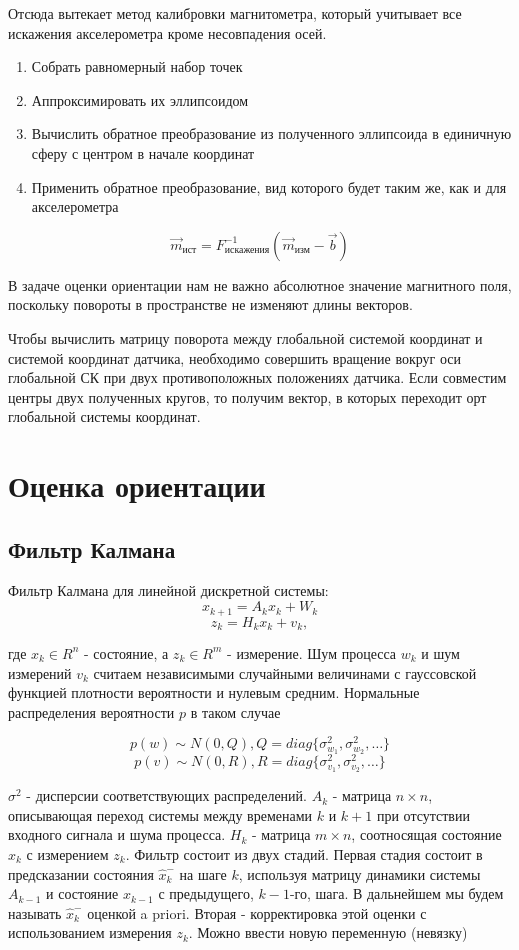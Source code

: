 \documentclass[a4paper]{article}
\begin{document}
Отсюда вытекает метод калибровки магнитометра, который учитывает все искажения акселерометра кроме несовпадения осей. 

\begin{enumerate}
	\item Собрать равномерный набор точек
	\item Аппроксимировать их эллипсоидом
	\item Вычислить обратное преобразование из полученного эллипсоида в единичную сферу с центром в начале координат
	\item Применить обратное преобразование, вид которого будет таким же, как и для акселерометра
\end{enumerate}

$$ \vec{m}_{\text{ист}} = F_{\text{искажения}}^{-1}(\vec{m}_{\text{изм}} - \vec{b}) $$

В задаче оценки ориентации нам не важно абсолютное значение магнитного поля, поскольку повороты в пространстве не изменяют длины векторов.

Чтобы вычислить матрицу поворота между глобальной системой координат и системой координат датчика, необходимо совершить вращение вокруг оси глобальной СК при двух противоположных положениях датчика. Если совместим центры двух полученных кругов, то получим вектор, в которых переходит орт глобальной системы координат.

\section{Оценка ориентации}

\subsection{Фильтр Калмана}

Фильтр Калмана для линейной дискретной системы:
$$ x_{k+1} = A_k x_k + W_k $$
$$ z_k = H_k x_k +v_k, $$

где $x_k \in R^n$ - состояние, а $z_k \in R^m$ - измерение. Шум процесса $w_k$ и шум измерений $v_k$ считаем независимыми случайными величинами с гауссовской функцией плотности вероятности и нулевым средним. Нормальные распределения вероятности $p$ в таком случае

$$ p(w) \sim N(0,Q), Q = diag\{ \sigma^2_{w_1}, \sigma^2_{w_2}, \dots \} $$
$$ p(v) \sim N(0,R), R = diag\{ \sigma^2_{v_1}, \sigma^2_{v_2}, \dots \} $$

$\sigma^2$ - дисперсии соответствующих распределений. $A_k$ - матрица $n \times n$, описывающая переход системы между временами $k$ и $k+1$ при отсутствии входного сигнала и шума процесса. $H_k$ - матрица $m \times n$, соотносящая состояние $x_k$ с измерением $z_k$. Фильтр состоит из двух стадий. Первая стадия состоит в предсказании состояния $\hat{x}_k^-$ на шаге $k$, используя матрицу динамики системы $A_{k-1}$ и состояние $x_{k-1}$ с предыдущего, $k-1$-го, шага. В дальнейшем мы будем называть $\hat{x}_k^-$ оценкой a priori. Вторая - корректировка этой оценки с использованием измерения $z_k$. Можно ввести новую переменную (невязку)
\end{document}
